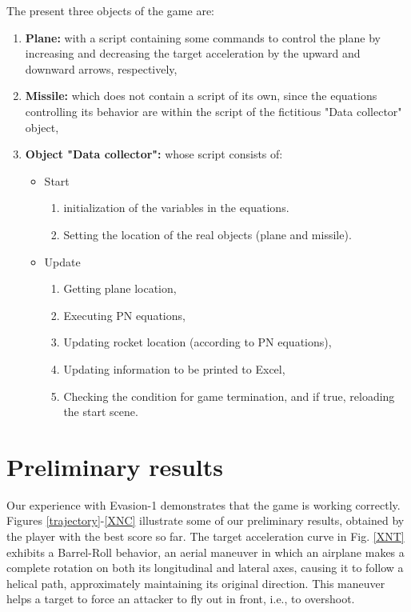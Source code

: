 The present three objects of the game are:
\begin{enumerate}
	\item \textbf{Plane:} with a script containing some commands to control the plane by increasing and decreasing the target acceleration by the upward and downward arrows, respectively,
	\item \textbf{Missile:} which does not contain a script of its own, since the equations controlling its behavior are within the script of the fictitious "Data collector" object,
	\item \textbf{Object "Data collector":} whose script consists of:
	
	\begin{itemize}
		\item Start
		\begin{enumerate}
			\item initialization of the variables in the equations.
			\item Setting the location of the real objects (plane and missile).
		\end{enumerate}
		\item Update 
		\begin{enumerate}
			\item Getting plane location,
			\item Executing PN equations,
			\item Updating rocket location (according to PN equations),
			\item Updating information to be printed to Excel,
			\item Checking the condition for game termination, and if true, reloading the start scene.
		\end{enumerate}
	\end{itemize}


\end{enumerate} 




 
\section{Preliminary results}

Our experience with Evasion-1 demonstrates that the game is working correctly. Figures \ref{trajectory}-\ref{XNC} illustrate some of our preliminary results, obtained by the player with the best score so far. The target acceleration curve in Fig. \ref{XNT} exhibits a Barrel-Roll behavior, an aerial maneuver in which an airplane makes a complete rotation on both its longitudinal and lateral axes, causing it to follow a helical path, approximately maintaining its original direction. This maneuver helps a target to force an attacker to fly out in front, i.e., to overshoot. 

